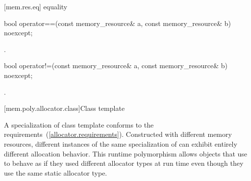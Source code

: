 [mem.res.eq]{ equality}

%
\begin{itemdecl}
bool operator==(const memory_resource& a, const memory_resource& b) noexcept;
\end{itemdecl}

\begin{itemdescr}
\pnum
\returns
{}.
\end{itemdescr}

%
\begin{itemdecl}
bool operator!=(const memory_resource& a, const memory_resource& b) noexcept;
\end{itemdecl}

\begin{itemdescr}
\pnum
\returns
{}.
\end{itemdescr}

[mem.poly.allocator.class]{Class template }

\pnum
A specialization of class template 
conforms to the  requirements~(\ref{allocator.requirements}).
Constructed with different memory resources,
different instances of the same specialization of 
can exhibit entirely different allocation behavior.
This runtime polymorphism allows objects that use 
to behave as if they used different allocator types at run time
even though they use the same static allocator type.

